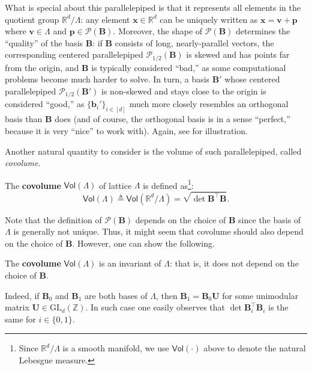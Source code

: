\documentclass[../../book.tex]{subfiles}
\begin{document}
What is special about this parallelepiped is that it represents all elements in the quotient group $\mathbb{R}^d/\Lambda$: any element $\mathbf{x} \in \mathbb{R}^d$ can be uniquely written as $\mathbf{x} = \mathbf{v} + \mathbf{p}$ where $\mathbf{v} \in \Lambda$ and $\mathbf{p} \in \mathcal{P}(\mathbf{B})$.
Moreover, the shape of $\mathcal{P}(\mathbf{B})$ determines the ``quality'' of the basis $\mathbf{B}$:
if $\mathbf{B}$ consists of long, nearly-parallel vectors, the corresponding centered parallelepiped
$\mathcal{P}_{1/2}(\mathbf{B})$ is skewed and has points far from the origin, and $\mathbf{B}$ is typically
considered ``bad,'' as some computational problems become much harder to solve.
In turn, a basis $\mathbf{B}'$ whose centered parallelepiped $\mathcal{P}_{1/2}(\mathbf{B}')$ is non-skewed
and stays close to the origin is considered ``good,'' as $\{\mathbf{b}_i'\}_{i \in [d]}$ much more
closely resembles an orthogonal basis than $\mathbf{B}$ does (and of course, the orthogonal basis is in
a sense ``perfect,'' because it is very ``nice'' to work with).
Again, see  for illustration.

Another natural quantity to consider is the volume of such parallelepiped, called \textit{covolume}.

\begin{definition}[Covolume]
    The \textbf{covolume} $\mathsf{Vol}(\Lambda)$ of lattice $\Lambda$ is defined as\footnote{Since $\mathbb{R}^d/\Lambda$ is a smooth manifold, we use $\mathsf{Vol}(\cdot)$ above to denote the natural Lebesgue measure.}:
    \begin{equation*}
        \mathsf{Vol}(\Lambda) \triangleq \mathsf{Vol}(\mathbb{R}^d/\Lambda) = \sqrt{\det \mathbf{B}^{\top}\mathbf{B}}.
    \end{equation*}
\end{definition}

Note that the definition of $\mathcal{P}(\mathbf{B})$ depends on the choice of $\mathbf{B}$ since the basis of $\Lambda$ is generally not unique.
Thus, it might seem that covolume should also depend on the choice of $\mathbf{B}$.
However, one can show the following.

\begin{proposition}
    The \textbf{covolume} $\mathsf{Vol}(\Lambda)$ is an invariant of $\Lambda$:
    that is, it does not depend on the choice of $\mathbf{B}$.
\end{proposition}

Indeed, if $\mathbf{B}_0$ and $\mathbf{B}_1$ are both bases of $\Lambda$, then $\mathbf{B}_1=\mathbf{B}_0\mathbf{U}$ for some unimodular matrix $\mathbf{U} \in \text{GL}_d(\mathbb{Z})$.
In such case one easily observes that $\det \mathbf{B}^{\top}_i\mathbf{B}_i$ is the same for $i \in \{0,1\}$.
\end{document}

